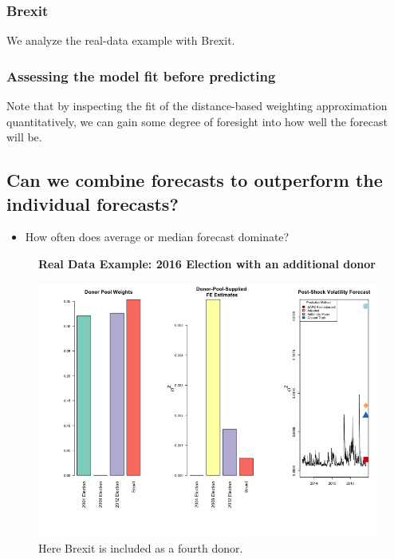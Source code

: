 \documentclass[11pt,3p,review,authoryear]{elsarticle}
\theoremstyle{definition}
\begin{document}
\subsubsection{Brexit}
We analyze the real-data example with Brexit.

\subsubsection{Assessing the model fit before predicting}

Note that by inspecting the fit of the distance-based weighting approximation quantitatively, we can gain some degree of foresight into how well the forecast will be.

\subsection{Can we combine forecasts to outperform the individual forecasts?}

\begin{itemize}
  \item How often does average or median forecast dominate?
\end{itemize}

\begin{figure}[H]
  \begin{center}
    \textbf{Real Data Example: 2016 Election with an additional donor}\par\medskip
    \includegraphics[scale=.6]{real_data_output_plots/FriMay311830182024_IYG_None_None.png}
    \caption{Here Brexit is included as a fourth donor.}
    \label{fig:SVF_2016_with_Brexit}
    \end{center}
  \end{figure}

\clearpage


\end{document}
